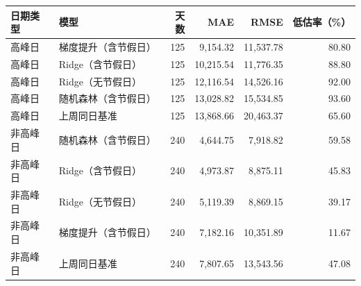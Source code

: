 \begin{tabular}{llrrrr}
\toprule
日期类型 & 模型 & 天数 & MAE & RMSE & 低估率（\%） \\
\midrule
高峰日 & 梯度提升（含节假日） & 125 & 9,154.32 & 11,537.78 & 80.80 \\
高峰日 & Ridge（含节假日） & 125 & 10,215.54 & 11,776.35 & 88.80 \\
高峰日 & Ridge（无节假日） & 125 & 12,116.54 & 14,526.16 & 92.00 \\
高峰日 & 随机森林（含节假日） & 125 & 13,028.82 & 15,534.85 & 93.60 \\
高峰日 & 上周同日基准 & 125 & 13,868.66 & 20,463.37 & 65.60 \\
非高峰日 & 随机森林（含节假日） & 240 & 4,644.75 & 7,918.82 & 59.58 \\
非高峰日 & Ridge（含节假日） & 240 & 4,973.87 & 8,875.11 & 45.83 \\
非高峰日 & Ridge（无节假日） & 240 & 5,119.39 & 8,869.15 & 39.17 \\
非高峰日 & 梯度提升（含节假日） & 240 & 7,182.16 & 10,351.89 & 11.67 \\
非高峰日 & 上周同日基准 & 240 & 7,807.65 & 13,543.56 & 47.08 \\
\bottomrule
\end{tabular}
